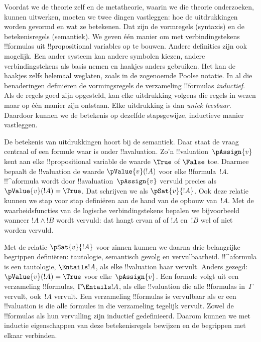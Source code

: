 \documentclass[openany]{memoir}
\begin{document}
Voordat we de theorie zelf en de metatheorie, waarin we die theorie
onderzoeken, kunnen uitwerken, moeten we twee dingen vastleggen: hoe de
uitdrukkingen worden gevormd en wat ze betekenen. Dat zijn de
vormregels (syntaxis) en de betekenisregels (semantiek). We geven één
manier om met verbindingstekens !!{formula}s uit !!{propositional
variable}s op te bouwen. Andere definities zijn ook mogelijk. Een
ander systeem kan andere symbolen kiezen, andere verbindingstekens als
basis nemen en haakjes anders gebruiken. Het kan de haakjes zelfs
helemaal weglaten, zoals in de zogenoemde Poolse notatie. In al die
benaderingen definiëren de vormingsregels de verzameling !!{formula}s
\emph{inductief}. Als de regels goed zijn opgesteld, kan elke
uitdrukking volgens die regels in wezen maar op één manier zijn
ontstaan. Elke uitdrukking is dan \emph{uniek leesbaar}. Daardoor
kunnen we de betekenis op dezelfde stapsgewijze, inductieve manier
vastleggen.

De betekenis van uitdrukkingen hoort bij de semantiek. Daar staat de
vraag centraal of een formule waar is onder !!a{valuation}. Zo'n
!!{valuation}~$\pAssign{v}$ kent aan elke !!{propositional variable}
  de waarde $\True$ of $\False$ toe. Daarmee bepaalt de !!{valuation}
  de waarde $\pValue{v}(!A)$ voor elke !!{formula}~$!A$. !!^a{formula}
wordt door !!a{valuation}~$\pAssign{v}$ vervuld precies als
$\pValue{v}(!A) = \True$. Dat schrijven we als $\pSat{v}{!A}$. Ook
deze relatie kunnen we stap voor stap definiëren aan de hand van de
opbouw van~$!A$. Met de waarheidsfuncties van de logische
verbindingstekens bepalen we bijvoorbeeld wanneer $!A \land !B$ wordt
vervuld: dat hangt ervan af of $!A$ en~$!B$ wel of niet worden
vervuld.

Met de relatie $\pSat{v}{!A}$ voor zinnen kunnen we daarna drie
belangrijke begrippen definiëren: tautologie, semantisch gevolg en
vervulbaarheid. !!^a{formula} is een tautologie, $\Entails !A$, als
  elke !!{valuation} haar vervult. Anders gezegd:
  $\pValue{v}(!A) = \True$ voor elke~$\pAssign{v}$. Een formule volgt uit een
verzameling !!{formula}s, $\Gamma \Entails !A$, als elke
!!{valuation} die alle !!{formula}s in~$\Gamma$ vervult, ook~$!A$
vervult. Een verzameling !!{formula}s is vervulbaar als er een
!!{valuation} is die alle formules in die verzameling tegelijk
vervult. Zowel de !!{formula}s als hun vervulling zijn inductief
gedefinieerd. Daarom kunnen we met inductie eigenschappen van deze
betekenisregels bewijzen en de begrippen met elkaar verbinden.
\endgroup
\end{document}
